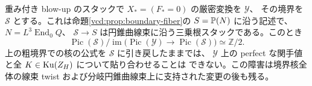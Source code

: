 \begin{theorem}[もう一成分への境界核の行列式障害]\label{vcd:thm:boundary-parity}
重み付き blow-up のスタックで $X_*=(F_*=0)$ の厳密変換を $\mathcal Y$、
その境界を $\mathcal S$ とする。これは命題\ref{vcd:prop:boundary-fiber}の
$S=\mathbb P(N)$ に沿う記述で、$N=L^3\operatorname{End}_0Q$、
$\mathcal S\to S$ は円錐曲線束に沿う三乗根スタックである。このとき
\[
 \operatorname{Pic}(\mathcal S)/
 \operatorname{im}\big(\operatorname{Pic}(\mathcal Y)\to
                           \operatorname{Pic}(\mathcal S)\big)
       \simeq \mathbb Z/2 .
\]
上の粗境界での核の公式を $\mathcal S$ に引き戻したままでは、
$\mathcal Y$ 上の perfect な関手値と全 $K\in\operatorname{Ku}(Z_H)$ について貼り合わせることは
できない。この障害は境界核全体の線束 twist および分岐円錐曲線束上に支持された変更の後も残る。
\end{theorem}
